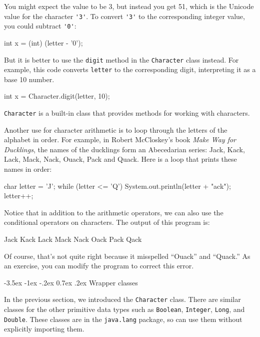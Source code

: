\documentclass[12pt]{book}
\makeatletter
\theoremstyle{exercise}
\newcommand{\java}[1]{\verb"#1"}
\renewcommand{\section}{\@startsection{section}{1}{\z@}%
    {-3.5ex \@plus -1ex \@minus -.2ex}%
    {0.7ex \@plus.2ex}%
    {\normalfont\Large\bfseries}}
\newcommand{\java}[1]{\lstinline{#1}} %
\makeatother
\begin{document}
You might expect the value to be 3, but instead you get 51, which is the Unicode value for the character \java{'3'}.
To convert \java{'3'} to the corresponding integer value, you could subtract \java{'0'}:

\begin{code}
    int x = (int) (letter - '0');
\end{code}

But it is better to use the \java{digit} method in the \java{Character} class instead.
For example, this code converts \java{letter} to the corresponding digit, interpreting it as a base 10 number.

\begin{code}
    int x = Character.digit(letter, 10);
\end{code}

\java{Character} is a built-in class that provides methods for working with characters.

Another use for character arithmetic is to loop through the letters of the alphabet in order.
For example, in Robert McCloskey's book {\em Make Way for Ducklings}, the names of the ducklings form an Abecedarian series: Jack, Kack, Lack, Mack, Nack, Ouack, Pack and Quack.
Here is a loop that prints these names in order:

\begin{code}
    char letter = 'J';
    while (letter <= 'Q') {
        System.out.println(letter + "ack");
        letter++;
    }
\end{code}

Notice that in addition to the arithmetic operators, we can also use the conditional operators on characters.
The output of this program is:

\begin{stdout}
Jack
Kack
Lack
Mack
Nack
Oack
Pack
Qack
\end{stdout}

Of course, that's not quite right because it misspelled ``Ouack'' and ``Quack.''
As an exercise, you can modify the program to correct this error.


\section{Wrapper classes}

In the previous section, we introduced the \java{Character} class.
There are similar classes for the other primitive data types such as \java{Boolean}, \java{Integer}, \java{Long}, and \java{Double}.
These classes are in the \java{java.lang} package, so can use them without explicitly importing them.
\end{document}
